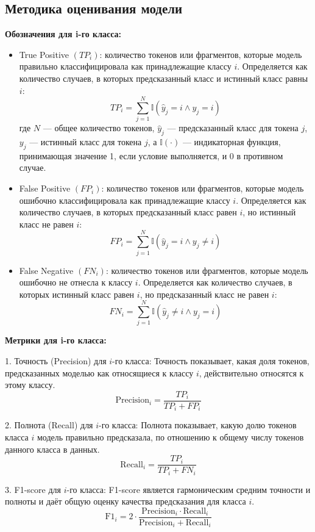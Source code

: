 \documentclass[12pt]{article}
\begin{document}
\subsection{Методика оценивания модели}
\textbf{Обозначения для i-го класса:}
\begin{itemize}
    \item True Positive $(TP_i)$: количество токенов или фрагментов, которые модель правильно классифицировала как принадлежащие классу $i$. Определяется как количество случаев, в которых предсказанный класс и истинный класс равны $i$:
    \[
    TP_i = \sum_{j=1}^{N} \mathbb{I}(\hat{y}_j = i \land y_j = i)
    \]
    где $N$ — общее количество токенов, $\hat{y}_j$ — предсказанный класс для токена $j$, $y_j$ — истинный класс для токена $j$, а $\mathbb{I}(\cdot)$ — индикаторная функция, принимающая значение 1, если условие выполняется, и 0 в противном случае.

    \item False Positive $(FP_i)$: количество токенов или фрагментов, которые модель ошибочно классифицировала как принадлежащие классу $i$. Определяется как количество случаев, в которых предсказанный класс равен $i$, но истинный класс не равен $i$:
    \[
    FP_i = \sum_{j=1}^{N} \mathbb{I}(\hat{y}_j = i \land y_j \neq i)
    \]

    \item False Negative $(FN_i)$: количество токенов или фрагментов, которые модель ошибочно не отнесла к классу $i$. Определяется как количество случаев, в которых истинный класс равен $i$, но предсказанный класс не равен $i$:
    \[
    FN_i = \sum_{j=1}^{N} \mathbb{I}(\hat{y}_j \neq i \land y_j = i)
    \]
\end{itemize}


\textbf{Метрики для i-го класса:}

1. Точность (Precision) для \( i \)-го класса: Точность показывает, какая доля токенов, предсказанных моделью как относящиеся к классу \( i \), действительно относятся к этому классу.
\[
\text{Precision}_i = \frac{TP_i}{TP_i + FP_i}
\]

2. Полнота (Recall) для \( i \)-го класса: Полнота показывает, какую долю токенов класса \( i \) модель правильно предсказала, по отношению к общему числу токенов данного класса в данных.
\[
\text{Recall}_i = \frac{TP_i}{TP_i + FN_i}
\]

3. F1-score для \( i \)-го класса: F1-score является гармоническим средним точности и полноты и даёт общую оценку качества предсказания для класса \( i \).
\[
\text{F1}_i = 2 \cdot \frac{\text{Precision}_i \cdot \text{Recall}_i}{\text{Precision}_i + \text{Recall}_i}
\]
\end{document}
